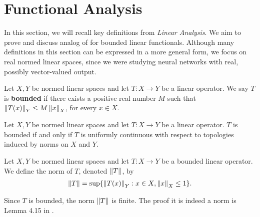 \section{Functional Analysis}
\label{section:appendix:functional-analysis}
In this section, we will recall key definitions from \textit{Linear Analysis}. We aim to prove  and discuss analog of  for bounded linear functionals. Although many definitions in this section can be expressed in a more general form, we focus on real normed linear spaces, since we were studying neural networks with real, possibly vector-valued output.

\begin{definition}
Let $X, Y$ be normed linear spaces and let $T : X \to Y$ be a linear operator. We say $T$ is \textbf{bounded}
if there exists a positive real number $M$ such that $\left\lVert T(x)\right\rVert_Y \leq M \left\lVert x\right\rVert_X$, for every $x \in X$.
\end{definition}

\begin{lemma}
Let $X, Y$ be normed linear spaces and let $T : X \to Y$ be a linear operator. $T$ is bounded if and only if $T$ is uniformly continuous with respect to topologies induced by norms on $X$ and $Y$.
\end{lemma}

\begin{definition}
Let $X, Y$ be normed linear spaces and let $T : X \to Y$ be a bounded linear operator. We define the norm of $T$, denoted $\left\lVert T\right\rVert$, by
\begin{align*}
    \left\lVert T\right\rVert = \sup \{ \left\lVert T(x)\right\rVert_Y : x \in X, \left\lVert x\right\rVert_X \leq 1 \}.
\end{align*}
\end{definition}
\begin{remark}
Since $T$ is bounded, the norm $\left\lVert T\right\rVert$ is finite. The proof it is indeed a norm is Lemma 4.15 in \cite{rynne_2008_linear}.
\end{remark}

